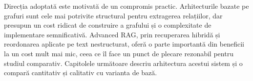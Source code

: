 Direcția adoptată este motivată de un compromis practic. Arhitecturile bazate pe grafuri sunt cele mai potrivite structural pentru extragerea relațiilor, dar presupun un cost ridicat de construire a grafului și o complexitate de implementare semnificativă. Advanced RAG, prin recuperarea hibridă și reordonarea aplicate pe text nestructurat, oferă o parte importantă din beneficii la un cost mult mai mic, ceea ce îl face un punct de plecare rezonabil pentru studiul comparativ. Capitolele următoare descriu arhitectura acestui sistem și o compară cantitativ și calitativ cu varianta de bază.